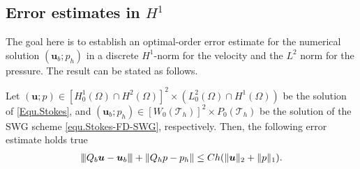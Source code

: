 \documentclass[final,leqno]{siamltex704}
\newcommand{\vertiii}[1]{{\left\vert\kern-0.25ex\left\vert\kern-0.25ex\left\vert #1
    \right\vert\kern-0.25ex\right\vert\kern-0.25ex\right\vert}}
\def\T{{\mathcal T}}
\begin{document}
\subsection{Error estimates in $H^1$} The goal here is to establish an optimal-order error estimate for the numerical solution $(\bm{u}_b; p_h)$ in a discrete $H^1$-norm for the velocity and the $L^2$ norm for the pressure. The result can be stated as follows.

\begin{theorem}\label{thm.error.1}
Let $(\bm{u};p) \in [H_0^1(\Omega)\cap H^{2}(\Omega)]^2\times (L_0^2(\Omega)\cap H^{1}(\Omega))$ be the solution of \eqref{Equ.Stokes}, and $(\bm{u}_b;p_h) \in [W_0(\T_h)]^2 \times P_0(\T_h)$ be the solution of the SWG scheme \eqref{equ.Stokes-FD-SWG}, respectively.
Then, the following error estimate holds true
\begin{eqnarray} \label{equ.thm.error.1}
\vertiii{Q_b\bm{u} -\bm{u}_b} +\|Q_h p - p_h\| \leq Ch(\|\bm{u}\|_2+\|p\|_1).
\end{eqnarray}
\end{theorem}
\end{document}
